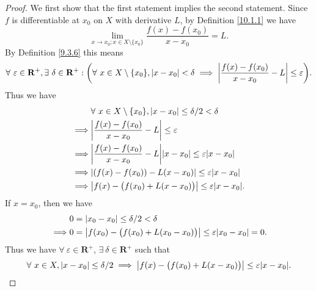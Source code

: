 \begin{proof}
    We first show that the first statement implies the second statement.
    Since \(f\) is differentiable at \(x_0\) on \(X\) with derivative \(L\), by Definition \ref{10.1.1} we have
    \[
        \lim_{x \to x_0 ; x \in X \setminus \{x_0\}} \frac{f(x) - f(x_0)}{x - x_0} = L.
    \]
    By Definition \ref{9.3.6} this means
    \[
        \forall\ \varepsilon \in \mathbf{R}^+, \exists\ \delta \in \mathbf{R}^+ : \bigg(\forall\ x \in X \setminus \{x_0\}, \abs*{x - x_0} < \delta \implies \abs*{\frac{f(x) - f(x_0)}{x - x_0} - L} \leq \varepsilon\bigg).
    \]
    Thus we have
    \begin{align*}
                 & \forall\ x \in X \setminus \{x_0\}, \abs*{x - x_0} \leq \delta / 2 < \delta             \\
        \implies & \abs*{\frac{f(x) - f(x_0)}{x - x_0} - L} \leq \varepsilon                               \\
        \implies & \abs*{\frac{f(x) - f(x_0)}{x - x_0} - L} \abs*{x - x_0} \leq \varepsilon \abs*{x - x_0} \\
        \implies & \abs*{(f(x) - f(x_0)) - L(x - x_0)} \leq \varepsilon \abs*{x - x_0}                     \\
        \implies & \abs*{f(x) - \big(f(x_0) + L(x - x_0)\big)} \leq \varepsilon \abs*{x - x_0}.
    \end{align*}
    If \(x = x_0\), then we have
    \begin{align*}
                 & 0 = \abs*{x_0 - x_0} \leq \delta / 2 < \delta                                              \\
        \implies & 0 = \abs*{f(x_0) - \big(f(x_0) + L(x_0 - x_0)\big)} \leq \varepsilon \abs*{x_0 - x_0} = 0.
    \end{align*}
    Thus we have \(\forall\ \varepsilon \in \mathbf{R}^+\), \(\exists\ \delta \in \mathbf{R}^+\) such that
    \[
        \forall\ x \in X, \abs*{x - x_0} \leq \delta / 2 \implies \abs*{f(x) - \big(f(x_0) + L(x - x_0)\big)} \leq \varepsilon \abs*{x - x_0}.
    \]


\end{proof}
